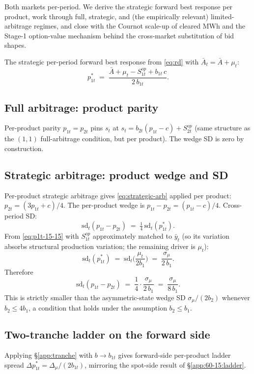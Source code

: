 \documentclass[11pt]{article}
\begin{document}
Both markets per-period. We derive the strategic forward best response per product, work through full, strategic, and (the empirically relevant) limited-arbitrage regimes, and close with the Cournot scale-up of cleared MWh and the Stage-1 option-value mechanism behind the cross-market substitution of bid shapes.

The strategic per-period forward best response from \eqref{eq:rd} with $\bar A_t = \bar A + \mu_t$:
\begin{equation}
p_{1t}^* \;=\; \frac{\bar A + \mu_t - S^{op}_{1t} + b_{1t}\, c}{2\, b_{1t}}.
\label{eq:p1t-15-15}
\end{equation}

\subsection{Full arbitrage: product parity}\label{app:15-15:full}
Per-product parity $p_{1t} = p_{2t}$ pins $s_t$ at $s_t = b_{2t}(p_{1t} - c) + S^{op}_{2t}$ (same structure as the $(1,1)$ full-arbitrage condition, but per product). The wedge SD is zero by construction.

\subsection{Strategic arbitrage: product wedge and SD}\label{app:15-15:strategic}
Per-product strategic arbitrage gives \eqref{eq:strategic-arb} applied per product: $p_{2t} = (3 p_{1t} + c)/4$. The per-product wedge is $p_{1t} - p_{2t} = (p_{1t} - c)/4$. Cross-period SD:
\[
\mathrm{sd}_t(p_{1t} - p_{2t}) \;=\; \tfrac{1}{4}\,\mathrm{sd}_t(p_{1t}^*).
\]
From \eqref{eq:p1t-15-15} with $S^{op}_{1t}$ approximately matched to $\bar y_t$ (so its variation absorbs structural production variation; the remaining driver is $\mu_t$):
\[
\mathrm{sd}_t(p_{1t}^*) \;=\; \mathrm{sd}_t\!\bigg(\frac{\mu_t}{2 b_1}\bigg) \;=\; \frac{\sigma_\mu}{2\, b_1}.
\]
Therefore
\begin{equation}
\boxed{\;\mathrm{sd}_t(p_{1t} - p_{2t}) \;=\; \frac{1}{4}\cdot\frac{\sigma_\mu}{2\, b_1} \;=\; \frac{\sigma_\mu}{8\, b_1}.\;}
\label{eq:wedge-sd-15-15}
\end{equation}
This is strictly smaller than the asymmetric-state wedge SD $\sigma_\mu/(2 b_2)$ whenever $b_2 \le 4 b_1$, a condition that holds under the \citeauthor{ito_reguant_2016} assumption $b_2 \le b_1$.

\subsection{Two-tranche ladder on the forward side}\label{app:15-15:ladder}
Applying \S\ref{app:tranche} with $b \to b_{1t}$ gives forward-side per-product ladder spread $\Delta p^*_{1t} = \Delta_\mu/(2 b_{1t})$, mirroring the spot-side result of \S\ref{app:60-15:ladder}.
\end{document}
